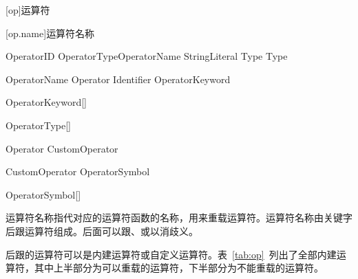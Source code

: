 
[op]{运算符}

[op.name]{运算符名称}

\begin{bnf}{OperatorID}
     OperatorType\bnfq OperatorName \br
     StringLiteral \br
     \terminal{\$} \br
      \br
      Type \br
      Type
\end{bnf}

\begin{bnf}{OperatorName}
    Operator \br
    Identifier \br
    OperatorKeyword \br
    \terminal{(} \terminal{)} \br
    \terminal{[} \terminal{]}
\end{bnf}

\begin{bnf}{OperatorKeyword}[\oneof]
\end{bnf}

\begin{bnf}{OperatorType}[\oneof]
\end{bnf}

\begin{bnf}{Operator}
    CustomOperator \br
    \terminal{;}
\end{bnf}

\begin{bnf}{CustomOperator}
    OperatorSymbol\bnfp
\end{bnf}

\begin{bnf}{OperatorSymbol}[\oneof]
\end{bnf}


\pnum
运算符名称指代对应的运算符函数的名称，用来重载运算符。运算符名称由关键字后跟运算符组成。后面可以跟、或以消歧义。

\pnum
{}后跟的运算符可以是内建运算符或自定义运算符。表~\ref{tab:op}~列出了全部内建运算符，其中上半部分为可以重载的运算符，下半部分为不能重载的运算符。

